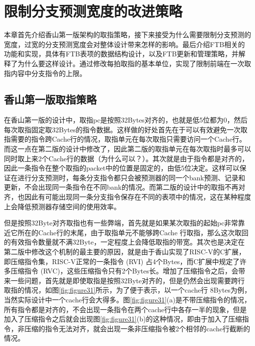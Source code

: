 \chapter{限制分支预测宽度的改进策略}

本章首先介绍香山第一版架构的取指策略，接下来接受为什么需要限制分支预测的宽度，过宽的分支预测宽度会对整体设计带来怎样的影响。最后介绍FTB相关的功能和实现，具体有FTB表项的数据结构设计，以及FTB更新和管理策略，并解释了为什么要这样设计。通过修改每拍取指的基本单位，实现了限制前端在一次取指内容中分支指令的上限。

\section{香山第一版取指策略}

在香山第一版的设计中，取指pc是按照32Bytes对齐的，也就是低5位都为0，然后每次取指固定取32Bytes的指令数据。这样做的好处首先在于可以有效避免一次取指需要的指令跨Cache行的情况，取指单元在每次取指只需要访问一个Cache行。而这一点在第二版的设计中修改了，因此第二版的取指单元在每次取指时最多可以同时取上来2个Cache行的数据（为什么可以？）。其次就是由于指令都是对齐的，因此一条指令在整个取指的packet中的位置是固定的，由低5位决定。这样可以保证在进行分支预测时，每条分支指令都只会被预测器的同一个bank预测、记录和更新，不会出现同一条指令在不同bank的情况。而第二版的设计中的取指不再对齐，也因此有可能出现同一条分支指令保存在不同的表项中的情况，这在某种程度上会降低预测器存储空间的使用效率。

但是按照32Byte对齐取指也有一些弊端，首先就是如果某次取指的起始pc非常靠近它所在的Cache行的末尾，由于取指单元不能够跨Cache 行取指，那么这次取回的有效指令数量就不满32Byte，一定程度上会降低取指的带宽。其次也是决定在第二版中修改这个机制的最主要的原因，就是由于香山实现了RISC-V的C扩展，即压缩指令集，RISC-V正常的一条指令 (RVI) 占4个Bytes，而C扩展中规定了许多压缩指令 (RVC)，这些压缩指令只有2个Bytes长。增加了压缩指令之后，会带来一些问题，首先就是即使取指是按照32Byte对齐的，但是仍然会出现需要跨行取指的情况，如图\ref{fig:figure31}所示，为了便于表示，以一个cache行 8Bytes为例，当然实际设计中一个cache行会大得多。图\ref{fig:figure31}(a)是不带压缩指令的情况，所有指令都是对齐的，不会出现一条指令在两个cache行中各存一半的现象，但是加入了压缩指令之后就会出现图\ref{fig:figure31}(b)的这种情况，即由于加入了压缩指令，非压缩的指令无法对齐，就会出现一条非压缩指令被2个相邻的cache行截断的情况。


